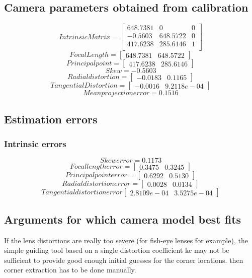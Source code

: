 \documentclass[11pt,a4paper]{article}
\begin{document}
\subsection{Camera parameters obtained from calibration}
\[ 
Intrinsic Matrix =
\begin{bmatrix}
648.7381 & 0 & 0 \\
-0.5603 & 648.5722 & 0 \\
417.6238 & 285.6146 & 1 \\
\end{bmatrix}
\]
\[ 
Focal Length = 
\begin{bmatrix}
648.7381 & 648.5722
\end{bmatrix}
\]
\[ 
Principal point =
\begin{bmatrix}
417.6238 & 285.6146
\end{bmatrix}
\]
\[ 
Skew = -0.5603
\]
\[
Radial distortion = 
\begin{bmatrix}
-0.0183 & 0.1165
\end{bmatrix}
\]
\[ 
Tangential Distortion = 
\begin{bmatrix}
-0.0016 & 9.2118e-04
\end{bmatrix}
\]
\[ 
Mean projection error = 0.1516
\]
\subsection{Estimation errors}
\subsubsection{Intrinsic errors}
\[
Skew error = 0.1173
\]
\[
Focal length error = 
\begin{bmatrix}
0.3475 & 0.3245
\end{bmatrix}
\]
\[
Principal point error = 
\begin{bmatrix}
0.6292 & 0.5130
\end{bmatrix}
\]
\[
Radial distortion error = 
\begin{bmatrix}
0.0028 & 0.0134
\end{bmatrix}
\]
\[
Tangential distortion error
\begin{bmatrix}
2.8109e-04 & 3.5275e-04
\end{bmatrix}
\]


\subsection{Arguments for which camera model best fits} 
	If the lens distortions are really too severe (for fish-eye lenses for example), the simple guiding tool based on a single distortion coefficient kc may not be sufficient to provide good enough initial guesses for the corner locations. then corner extraction has to be done manually.
\end{document}
